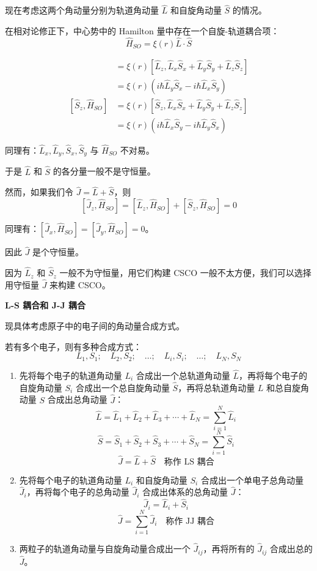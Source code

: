 \documentclass[lang=cn,10pt]{elegantbook}
\begin{document}
现在考虑这两个角动量分别为轨道角动量 $\hat{L}$ 和自旋角动量 $\hat{S}$ 的情况。

在相对论修正下，中心势中的 Hamilton 量中存在一个自旋-轨道耦合项：
\[
\hat{H}_{SO} = \xi(r) \hat{L} \cdot \hat{S}
\]

\begin{align*}
	[\hat{L}_z, \hat{H}_{SO}] &= \xi(r) [\hat{L}_z, \hat{L}_x \hat{S}_x + \hat{L}_y \hat{S}_y + \hat{L}_z \hat{S}_z] \\
	&= \xi(r) (i \hbar \hat{L}_y \hat{S}_x - i \hbar \hat{L}_x \hat{S}_y) \\
	[\hat{S}_z, \hat{H}_{SO}] &= \xi(r) [\hat{S}_z, \hat{L}_x \hat{S}_x + \hat{L}_y \hat{S}_y + \hat{L}_z \hat{S}_z] \\
	&= \xi(r) (i \hbar \hat{L}_x \hat{S}_y - i \hbar \hat{L}_y \hat{S}_x)
\end{align*}

同理有：$\hat{L}_x, \hat{L}_y, \hat{S}_x, \hat{S}_y$ 与 $\hat{H}_{SO}$ 不对易。

于是 $\hat{L}$ 和 $\hat{S}$ 的各分量一般不是守恒量。

然而，如果我们令 $\hat{J} = \hat{L} + \hat{S}$，则
\[
[\hat{J}_z, \hat{H}_{SO}] = [\hat{L}_z, \hat{H}_{SO}] + [\hat{S}_z, \hat{H}_{SO}] = 0
\]

同理有：$[\hat{J}_x, \hat{H}_{SO}] = [\hat{J}_y, \hat{H}_{SO}] = 0$。

因此 $\hat{J}$ 是个守恒量。

因为 $\hat{L}_z$ 和 $\hat{S}_z$ 一般不为守恒量，用它们构建 CSCO 一般不太方便，我们可以选择用守恒量 $\hat{J}$ 来构建 CSCO。

\textbf{L-S 耦合和 J-J 耦合}

现具体考虑原子中的电子间的角动量合成方式。

若有多个电子，则有多种合成方式：
\[
L_1, S_1; \quad L_2, S_2; \quad \ldots; \quad L_i, S_i; \quad \ldots; \quad L_N, S_N
\]

\begin{enumerate}
	\item 先将每个电子的轨道角动量 $L_i$ 合成出一个总轨道角动量 $\hat{L}$，再将每个电子的自旋角动量 $S_i$ 合成出一个总自旋角动量 $\hat{S}$，再将总轨道角动量 $L$ 和总自旋角动量 $S$ 合成出总角动量 $\hat{J}$：
	\[
	\hat{L} = \hat{L}_1 + \hat{L}_2 + \hat{L}_3 + \cdots + \hat{L}_N = \sum_{i=1}^{N} \hat{L}_i
	\]
	\[
	\hat{S} = \hat{S}_1 + \hat{S}_2 + \hat{S}_3 + \cdots + \hat{S}_N = \sum_{i=1}^{N} \hat{S}_i
	\]
	\[
	\hat{J} = \hat{L} + \hat{S} \quad \text{称作 LS 耦合}
	\]
	
	\item 先将每个电子的轨道角动量 $L_i$ 和自旋角动量 $S_i$ 合成出一个单电子总角动量 $\hat{J}_i$，再将每个电子的总角动量 $\hat{J}_i$ 合成出体系的总角动量 $\hat{J}$：
	\[
	\hat{J}_i = \hat{L}_i + \hat{S}_i
	\]
	\[
	\hat{J} = \sum_{i=1}^{N} \hat{J}_i \quad \text{称作 JJ 耦合}
	\]
	
	\item 两粒子的轨道角动量与自旋角动量合成出一个 $\hat{J}_{ij}$，再将所有的 $\hat{J}_{ij}$ 合成出总的 $\hat{J}$。
\end{enumerate}
\end{document}
